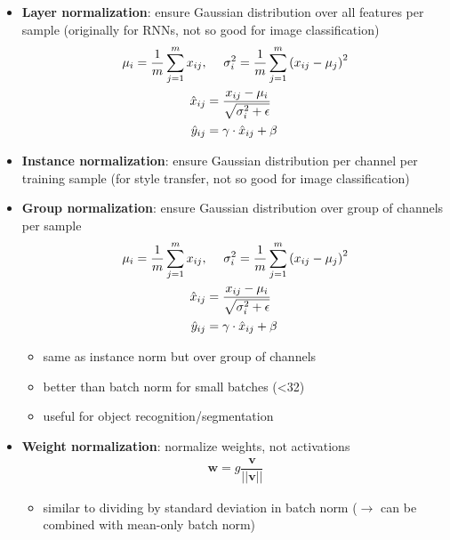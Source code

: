 \begin{itemize}
\begin{itemize}
\begin{itemize}
		\end{itemize}
	\end{itemize}
	\item \textbf{Layer normalization}: ensure Gaussian distribution over all features per sample (originally for RNNs, not so good for image classification)
	\begin{equation*}
		\begin{split}
			\mu_i = \frac{1}{m} \sum_{j=1}^{m} x_{ij}, &\hspace{5mm} \sigma_i^2 = \frac{1}{m} \sum_{j=1}^{m} \left(x_{ij} - \mu_j\right)^2 \\
			\hat{x}_{ij} & = \frac{x_{ij} - \mu_i}{\sqrt{\sigma_i^2 + \epsilon}} \\
			\hat{y}_{ij} & = \gamma \cdot \hat{x}_{ij} + \beta
		\end{split}
	\end{equation*}
	\item \textbf{Instance normalization}: ensure Gaussian distribution per channel per training sample (for style transfer, not so good for image classification)
	\item \textbf{Group normalization}: ensure Gaussian distribution over group of channels per sample
	\begin{equation*}
		\begin{split}
			\mu_i = \frac{1}{m} \sum_{j=1}^{m} x_{ij}, &\hspace{5mm} \sigma_i^2 = \frac{1}{m} \sum_{j=1}^{m} \left(x_{ij} - \mu_j\right)^2 \\
			\hat{x}_{ij} & = \frac{x_{ij} - \mu_i}{\sqrt{\sigma_i^2 + \epsilon}} \\
			\hat{y}_{ij} & = \gamma \cdot \hat{x}_{ij} + \beta
		\end{split}
	\end{equation*}
	\begin{itemize}
		\item same as instance norm but over group of channels
		\item better than batch norm for small batches (<32)
		\item useful for object recognition/segmentation
	\end{itemize}
	\item \textbf{Weight normalization}: normalize weights, not activations
	\begin{equation*}
		\begin{split}
			\mathbf{w} = g \dfrac{\mathbf{v}}{||\mathbf{v}||}
		\end{split}
	\end{equation*}
	\begin{itemize}
		\item similar to dividing by standard deviation in batch norm ($\rightarrow$ can be combined with mean-only batch norm)
	\end{itemize}
\end{itemize}
